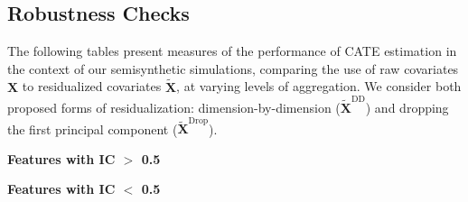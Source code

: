 \documentclass{article}
\theoremstyle{plain}
\theoremstyle{definition}
\theoremstyle{remark}
\begin{document}
\subsection{Robustness Checks}

The following tables present measures of the performance of CATE estimation in the context of our semisynthetic simulations, comparing the use of raw covariates $\mathbf{X}$ to residualized covariates $\mathbf{\widetilde{X}}$, at varying levels of aggregation. We consider both proposed forms of residualization: dimension-by-dimension ($\mathbf{\widetilde{X}}^{\textrm{DD}}$) and dropping the first principal component ($\mathbf{\widetilde{X}}^{\textrm{Drop}}$).

\newpage
\textbf{Features with IC $>$ 0.5}


\newpage
\textbf{Features with IC $<$ 0.5}

\end{document}
